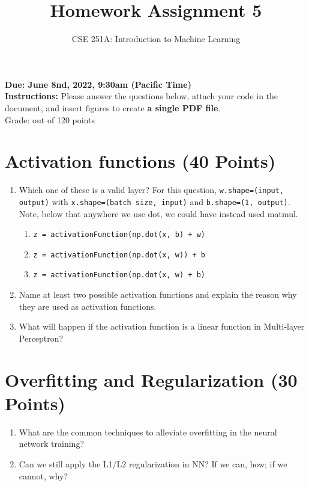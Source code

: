 \documentclass[12pt]{article}%
\begin{document}
\title{Homework Assignment 5}
\author{CSE 251A: Introduction to Machine Learning}
\date{}
\maketitle

\noindent \textbf {Due: June 8nd, 2022, 9:30am (Pacific Time)} \\


\noindent \textbf {Instructions:} Please answer the questions below, attach your code in the document, and insert figures to create \textbf{a single PDF file}. \\

\noindent Grade: \underline{\hspace{.8cm}} out of 120 points 








\section{Activation functions (40 Points)}
\begin{enumerate}
    \item Which one of these is a valid layer? For this question, \verb+w.shape=(input, output)+ with \verb+x.shape=(batch size, input)+ and \verb+b.shape=(1, output)+. Note, below that anywhere we use dot, we could have instead used matmul.
        \begin{enumerate}[label=(\alph*)]
            \item \texttt{z = activationFunction(np.dot(x, b) + w)}
            \item \texttt{z = activationFunction(np.dot(x, w)) + b}
            \item \texttt{z = activationFunction(np.dot(x, w) + b)}
        \end{enumerate}
    \item Name at least two possible activation functions and explain the reason why they are used as activation functions.
    \item What will happen if the activation function is a linear function in Multi-layer Perceptron?
\end{enumerate}






\newpage
\section{Overfitting and Regularization (30 Points)}
\begin{enumerate}
    \item What are the common techniques to alleviate overfitting in the neural network training? 
    \item Can we still apply the L1/L2 regularization in NN? If we can, how; if we cannot, why?
\end{enumerate}
\end{document}
